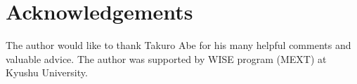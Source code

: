 \documentclass[12pt]{amsart}
\theoremstyle{definition}
\begin{document}

%
%



\section*{Acknowledgements}
The author would like to thank Takuro Abe 
for his many helpful comments and valuable advice. 
The author was supported by WISE program (MEXT) at Kyushu University. 
\vspace{-2mm}


\end{document}
